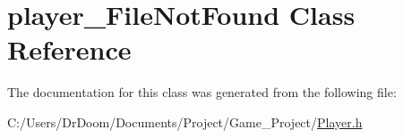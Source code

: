 \hypertarget{classplayer___file_not_found}{}\section{player\+\_\+\+File\+Not\+Found Class Reference}
\label{classplayer___file_not_found}


The documentation for this class was generated from the following file\+:\begin{DoxyCompactItemize}
\item 
C\+:/\+Users/\+Dr\+Doom/\+Documents/\+Project/\+Game\+\_\+\+Project/\hyperlink{_player_8h}{Player.\+h}\end{DoxyCompactItemize}
